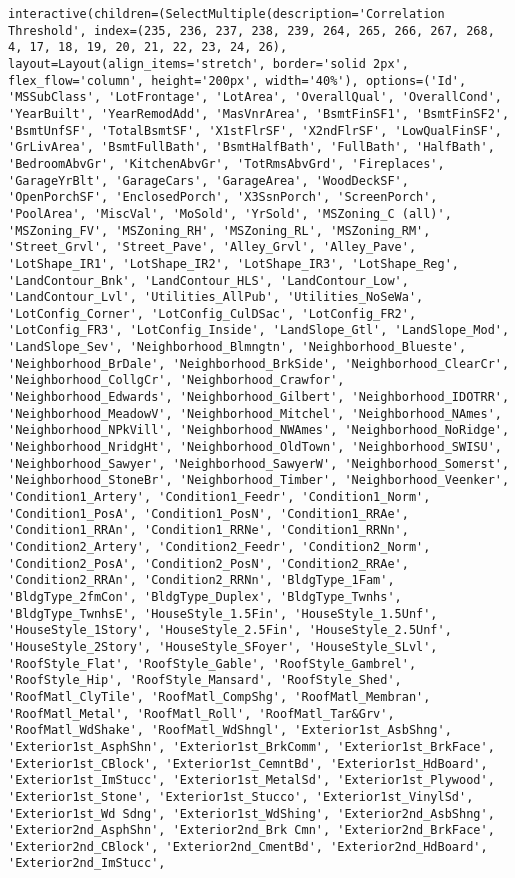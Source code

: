 \documentclass[11pt]{article}
\begin{document}
    
    \begin{verbatim}
interactive(children=(SelectMultiple(description='Correlation Threshold', index=(235, 236, 237, 238, 239, 264, 265, 266, 267, 268, 4, 17, 18, 19, 20, 21, 22, 23, 24, 26), layout=Layout(align_items='stretch', border='solid 2px', flex_flow='column', height='200px', width='40%'), options=('Id', 'MSSubClass', 'LotFrontage', 'LotArea', 'OverallQual', 'OverallCond', 'YearBuilt', 'YearRemodAdd', 'MasVnrArea', 'BsmtFinSF1', 'BsmtFinSF2', 'BsmtUnfSF', 'TotalBsmtSF', 'X1stFlrSF', 'X2ndFlrSF', 'LowQualFinSF', 'GrLivArea', 'BsmtFullBath', 'BsmtHalfBath', 'FullBath', 'HalfBath', 'BedroomAbvGr', 'KitchenAbvGr', 'TotRmsAbvGrd', 'Fireplaces', 'GarageYrBlt', 'GarageCars', 'GarageArea', 'WoodDeckSF', 'OpenPorchSF', 'EnclosedPorch', 'X3SsnPorch', 'ScreenPorch', 'PoolArea', 'MiscVal', 'MoSold', 'YrSold', 'MSZoning_C (all)', 'MSZoning_FV', 'MSZoning_RH', 'MSZoning_RL', 'MSZoning_RM', 'Street_Grvl', 'Street_Pave', 'Alley_Grvl', 'Alley_Pave', 'LotShape_IR1', 'LotShape_IR2', 'LotShape_IR3', 'LotShape_Reg', 'LandContour_Bnk', 'LandContour_HLS', 'LandContour_Low', 'LandContour_Lvl', 'Utilities_AllPub', 'Utilities_NoSeWa', 'LotConfig_Corner', 'LotConfig_CulDSac', 'LotConfig_FR2', 'LotConfig_FR3', 'LotConfig_Inside', 'LandSlope_Gtl', 'LandSlope_Mod', 'LandSlope_Sev', 'Neighborhood_Blmngtn', 'Neighborhood_Blueste', 'Neighborhood_BrDale', 'Neighborhood_BrkSide', 'Neighborhood_ClearCr', 'Neighborhood_CollgCr', 'Neighborhood_Crawfor', 'Neighborhood_Edwards', 'Neighborhood_Gilbert', 'Neighborhood_IDOTRR', 'Neighborhood_MeadowV', 'Neighborhood_Mitchel', 'Neighborhood_NAmes', 'Neighborhood_NPkVill', 'Neighborhood_NWAmes', 'Neighborhood_NoRidge', 'Neighborhood_NridgHt', 'Neighborhood_OldTown', 'Neighborhood_SWISU', 'Neighborhood_Sawyer', 'Neighborhood_SawyerW', 'Neighborhood_Somerst', 'Neighborhood_StoneBr', 'Neighborhood_Timber', 'Neighborhood_Veenker', 'Condition1_Artery', 'Condition1_Feedr', 'Condition1_Norm', 'Condition1_PosA', 'Condition1_PosN', 'Condition1_RRAe', 'Condition1_RRAn', 'Condition1_RRNe', 'Condition1_RRNn', 'Condition2_Artery', 'Condition2_Feedr', 'Condition2_Norm', 'Condition2_PosA', 'Condition2_PosN', 'Condition2_RRAe', 'Condition2_RRAn', 'Condition2_RRNn', 'BldgType_1Fam', 'BldgType_2fmCon', 'BldgType_Duplex', 'BldgType_Twnhs', 'BldgType_TwnhsE', 'HouseStyle_1.5Fin', 'HouseStyle_1.5Unf', 'HouseStyle_1Story', 'HouseStyle_2.5Fin', 'HouseStyle_2.5Unf', 'HouseStyle_2Story', 'HouseStyle_SFoyer', 'HouseStyle_SLvl', 'RoofStyle_Flat', 'RoofStyle_Gable', 'RoofStyle_Gambrel', 'RoofStyle_Hip', 'RoofStyle_Mansard', 'RoofStyle_Shed', 'RoofMatl_ClyTile', 'RoofMatl_CompShg', 'RoofMatl_Membran', 'RoofMatl_Metal', 'RoofMatl_Roll', 'RoofMatl_Tar&Grv', 'RoofMatl_WdShake', 'RoofMatl_WdShngl', 'Exterior1st_AsbShng', 'Exterior1st_AsphShn', 'Exterior1st_BrkComm', 'Exterior1st_BrkFace', 'Exterior1st_CBlock', 'Exterior1st_CemntBd', 'Exterior1st_HdBoard', 'Exterior1st_ImStucc', 'Exterior1st_MetalSd', 'Exterior1st_Plywood', 'Exterior1st_Stone', 'Exterior1st_Stucco', 'Exterior1st_VinylSd', 'Exterior1st_Wd Sdng', 'Exterior1st_WdShing', 'Exterior2nd_AsbShng', 'Exterior2nd_AsphShn', 'Exterior2nd_Brk Cmn', 'Exterior2nd_BrkFace', 'Exterior2nd_CBlock', 'Exterior2nd_CmentBd', 'Exterior2nd_HdBoard', 'Exterior2nd_ImStucc', 
\end{verbatim}
\end{document}
